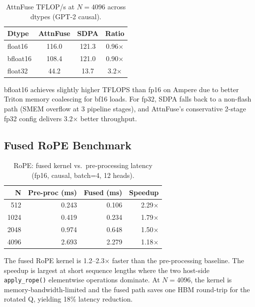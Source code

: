 \documentclass[10pt,twocolumn]{article}
\begin{document}
\begin{table}[H]
\centering
\caption{AttnFuse TFLOP/s at $N{=}4096$ across dtypes (GPT-2 causal).}
\label{tab:dtype}
\small
\begin{tabular}{lccc}
\toprule
\textbf{Dtype} & \textbf{AttnFuse} & \textbf{SDPA} & \textbf{Ratio} \\
\midrule
float16  & 116.0 & 121.3 & 0.96$\times$ \\
bfloat16 & 108.4 & 121.0 & 0.90$\times$ \\
float32  &  44.2 &  13.7 & 3.2$\times$  \\
\bottomrule
\end{tabular}
\end{table}

bfloat16 achieves slightly higher TFLOPS than fp16 on Ampere due to
better Triton memory coalescing for bf16 loads.  For fp32, SDPA falls
back to a non-flash path (SMEM overflow at 3 pipeline stages), and
AttnFuse's conservative 2-stage fp32 config delivers 3.2$\times$ better
throughput.

\subsection{Fused RoPE Benchmark}
\label{sec:rope}

\begin{table}[H]
\centering
\caption{RoPE: fused kernel vs.\ pre-processing latency (fp16, causal, batch=4, 12 heads).}
\label{tab:rope}
\small
\begin{tabular}{rrrr}
\toprule
\textbf{N} & \textbf{Pre-proc (ms)} & \textbf{Fused (ms)} & \textbf{Speedup} \\
\midrule
 512 & 0.243 & 0.106 & 2.29$\times$ \\
1024 & 0.419 & 0.234 & 1.79$\times$ \\
2048 & 0.974 & 0.648 & 1.50$\times$ \\
4096 & 2.693 & 2.279 & 1.18$\times$ \\
\bottomrule
\end{tabular}
\end{table}

The fused RoPE kernel is 1.2--2.3$\times$ faster than the pre-processing
baseline.  The speedup is largest at short sequence lengths where the two
host-side \texttt{apply\_rope()} elementwise operations dominate.
At $N{=}4096$, the kernel is memory-bandwidth-limited and the fused path
saves one HBM round-trip for the rotated Q, yielding 18\% latency reduction.
\end{document}
